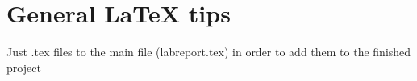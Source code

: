 \newcommand{\texMacro}[2]{\texttt{\textbackslash{#1}\{#2\}}}
\section{General LaTeX tips}\label{sec:latex_tips}

Just  .tex files to the main file (labreport.tex) in order to add them to the finished project